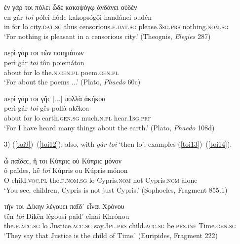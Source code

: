 \begin{exe}
\ex ἐν γάρ τοι πόλει ὧδε κακοψόγῳ ἁνδάνει οὐδέν\\
\gll en gár \emph{toi} pólei hôde kakopsógōi handánei oudén\\
in for lo city.\textsc{dat.sg} thus censorious.\textsc{f.dat.sg}
please.\textsc{3sg.prs} nothing.\textsc{nom.sg}\\
\trans `For nothing is pleasant in a censorious city.' (Theognis, \textit{Elegies} 287)
\label{toi6}
\end{exe}

\begin{exe}
\ex περὶ γάρ τοι τῶν ποιημάτων\\
\gll perì gár \emph{toi} tôn poiēmátōn\\
about for lo the.\textsc{n.gen.pl} poem.\textsc{gen.pl}\\
\trans `For about the poems ...' (Plato, \textit{Phaedo} 60c)
\label{toi7}
\end{exe}

\begin{exe}
\ex περὶ γάρ τοι γῆϲ {[}...{]} πολλὰ ἀκήκοα\\
\gll perì gár \emph{toi} gês pollà akḗkoa\\
about for lo earth.\textsc{gen.sg} much.\textsc{n.pl} hear.\textsc{1sg.prf}\\
\trans `For I have heard many things about the earth.' (Plato, \textit{Phaedo} 108d)
\label{toi8}
\end{exe}

3) (\ref{toi9})--(\ref{toi12}); also, with \textit{gár toí} `then lo', examples (\ref{toi13})--(\ref{toi14}).

\begin{exe}
\ex ὦ παῖδεϲ, ἥ τοι Κύπριϲ οὐ Κύπριϲ μόνον\\
\gll ô paîdes, hḗ \emph{toi} Kúpris ou Kúpris mónon\\
O child.\textsc{voc.pl} the.\textsc{f.nom.sg} lo Cypris.\textsc{nom} not Cypris.\textsc{nom} alone\\
\trans `You see, children, Cypris is not just Cypris.' (Sophocles, Fragment 855.1)
\label{toi9}
\end{exe}

\begin{exe}
\ex τήν τοι Δίκην λέγουϲι παῖδ᾽ εἶναι Χρόνου\\
\gll tḗn \emph{toi} Díkēn légousi paîd' eînai Khrónou\\
the.\textsc{f.acc.sg} lo Justice.\textsc{acc.sg} say.\textsc{3pl.prs} child.\textsc{acc.sg} be.\textsc{prs.inf} Time.\textsc{gen.sg}\\
\trans `They say that Justice is the child of Time.' (Euripides, Fragment 222)
\label{toi10}
\end{exe}

